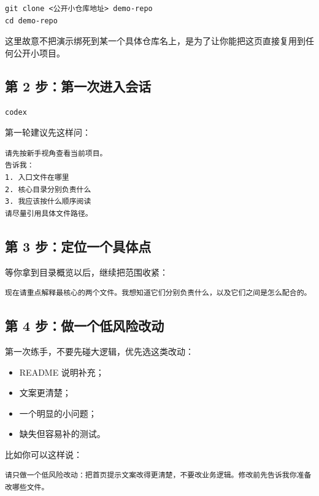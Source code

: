 \documentclass[UTF8,a4paper,12pt]{ctexart}
\begin{document}
\begin{lstlisting}[style=cli]
git clone <公开小仓库地址> demo-repo
cd demo-repo
\end{lstlisting}

这里故意不把演示绑死到某一个具体仓库名上，是为了让你能把这页直接复用到任何公开小项目。

\subsection{第 2 步：第一次进入会话}

\begin{lstlisting}[style=cli]
codex
\end{lstlisting}

第一轮建议先这样问：

\begin{lstlisting}[style=prompt]
请先按新手视角查看当前项目。
告诉我：
1. 入口文件在哪里
2. 核心目录分别负责什么
3. 我应该按什么顺序阅读
请尽量引用具体文件路径。
\end{lstlisting}

\subsection{第 3 步：定位一个具体点}

等你拿到目录概览以后，继续把范围收紧：

\begin{lstlisting}[style=prompt]
现在请重点解释最核心的两个文件。我想知道它们分别负责什么，以及它们之间是怎么配合的。
\end{lstlisting}

\subsection{第 4 步：做一个低风险改动}

第一次练手，不要先碰大逻辑，优先选这类改动：
\begin{itemize}
  \item README 说明补充；
  \item 文案更清楚；
  \item 一个明显的小问题；
  \item 缺失但容易补的测试。
\end{itemize}

比如你可以这样说：

\begin{lstlisting}[style=prompt]
请只做一个低风险改动：把首页提示文案改得更清楚，不要改业务逻辑。修改前先告诉我你准备改哪些文件。
\end{lstlisting}
\end{document}

